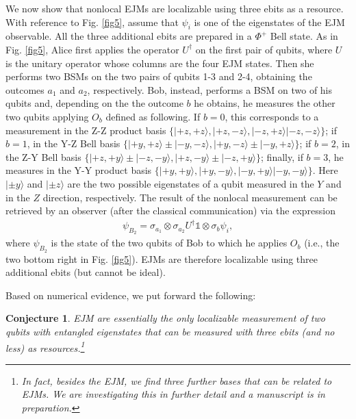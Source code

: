 \documentclass[12pt]{article}
\newcommand{\ket}[1]{| {#1} \rangle} %
\newtheorem{conj}{Conjecture}
\begin{document}
We now show that nonlocal EJMs are localizable using three ebits as a resource. With reference to Fig. \ref{fig5}, assume that $\psi_i$ is one of the eigenstates of the EJM observable. All the three additional ebits are prepared in a $\Phi^+$ Bell state. As in Fig. \ref{fig5}, Alice first applies the operator $U^\dagger$ on the first pair of qubits, where $U$ is the unitary operator whose columns are the four EJM states. Then she performs two BSMs on the two pairs of qubits 1-3 and 2-4, obtaining the outcomes $a_1$ and $a_2$, respectively. Bob, instead, performs a BSM on two of his qubits and, depending on the the outcome $b$ he obtains, he measures the other two qubits applying $O_b$ defined as following. If $b=0$, this corresponds to a measurement in the Z-Z product basis $\{\ket{+z,+z}, \ket{+z,-z}, \ket{-z,+z} \ket{-z, -z}\}$; if $b=1$, in the Y-Z Bell basis $\{\ket{+y,+z}\pm \ket{-y, -z},\ket{+y,-z}   \pm \ket{-y, +z}\}$; if $b=2$, in the Z-Y Bell basis $\{\ket{+z,+y}\pm \ket{-z, -y},\ket{+z,-y}    \pm \ket{-z, +y}\}$; finally, if $b=3$, he measures in the Y-Y product basis $\{\ket{+y,+y}, \ket{+y,-y}, \ket{-y,+y} \ket{-y, -y}\}$. Here $\ket{\pm y}$ and $\ket{\pm z}$ are the two possible eigenstates of a qubit measured in the $Y$ and in the $Z$ direction, respectively.  The result of the nonlocal measurement can be retrieved by an observer (after the classical communication) via the expression
\begin{eqnarray}
\label{ejmstate}
\psi_{B_2}=\sigma_{a_1}\otimes \sigma_{a_2} U^{\dagger}\mathds{1}\otimes\sigma_{b}\psi_i, %
\end{eqnarray}
where $\psi_{B_2}$ is the state of the two qubits of Bob to which he applies $O_b$ (i.e., the two bottom right in Fig. \ref{fig5}). EJMs are therefore localizable using three additional ebits (but cannot be ideal).

Based on numerical evidence, we put forward the following:
\begin{conj}
    EJM are essentially the only localizable measurement of two qubits with entangled eigenstates that can be measured with three ebits (and no less) as resources.\footnote{In fact, besides the EJM, we find three further bases that can be related to EJMs. We are investigating this in further detail and a manuscript is in preparation.}
\end{conj}

\end{document}
